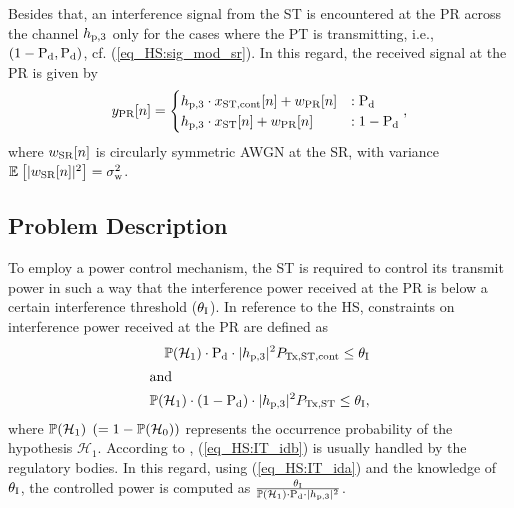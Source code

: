 Besides that, an interference signal from the ST is encountered at the PR across the channel $h_{\text{p,3}}$ only for the cases where the PT is transmitting, i.e., $(1 - \text{P}_{\text{d}}, \text{P}_{\text{d}})$, cf. (\ref{eq_HS:sig_mod_sr}). In this regard, the received signal at the PR is given by
\begin{equation}
y_{\text{PR}}[n] = 
\begin{cases}
h_{\text{p,3}} \cdot x_{\text{ST,cont}}[n] + w_{\text{PR}}[n] & : \text{P}_{\text{d}} \\
h_{\text{p,3}} \cdot x_{\text{ST}}[n] + w_{\text{PR}}[n] & : 1- \text{P}_{\text{d}} 
\end{cases},
\label{eq_HS:sig_mod_pr}
\end{equation}
where $w_{\text{SR}}[n]$ is circularly symmetric AWGN at the SR, with variance ${\mathbb E}_{}\left[ |w_{\text{SR}}[n]|^2 \right] = \sigma^2_{\text{w}}$.

\subsection{Problem Description}
To employ a power control mechanism, the ST is required to control its transmit power in such a way that the interference power received at the PR is below a certain interference threshold ($\theta_{\text{I}}$). In reference to the HS, constraints on interference power received at the PR are defined as
\begin{align}
\mathbb P(\mathcal{H}_1) \cdot \text{P}_{\text{d}} \cdot |h_{\text{p,3}}|^2 P_{\text{Tx,ST,cont}} \le \theta_{\text{I}} \label{eq_HS:IT_ida} \\
\intertext{and   } 
\mathbb P(\mathcal{H}_1) \cdot (1 - \text{P}_{\text{d}}) \cdot |h_{\text{p,3}}|^2 P_{\text{Tx,ST}} \le \theta_{\text{I}} \label{eq_HS:IT_idb},
\end{align}
where $\mathbb P(\mathcal{H}_1)$ $(= 1 - \mathbb P(\mathcal{H}_0))$ represents the occurrence probability of the hypothesis $\mathcal H_1$. 
According to \cite{Sharma14}, (\ref{eq_HS:IT_idb}) is usually handled by the regulatory bodies. In this regard, using (\ref{eq_HS:IT_ida}) and the knowledge of $\theta_{\text{I}}$, the controlled power is computed as $\frac{\theta_{\text{I}}}{\mathbb P(\mathcal{H}_1) \cdot \text{P}_{\text{d}} \cdot |h_{\text{p,3}}|^2}$.

